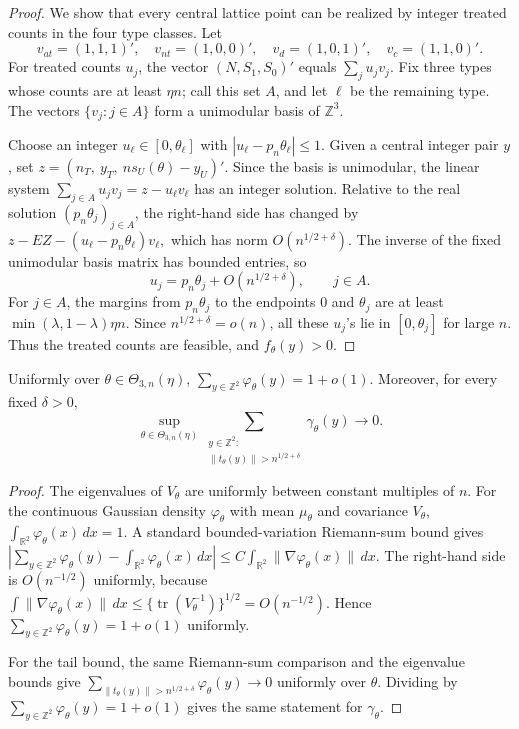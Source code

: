 \documentclass[12pt,reqno]{amsart}
\begin{document}
\begin{proof}
We show that every central lattice point can be realized by integer treated
counts in the four type classes.  Let
\[
v_{at}=(1,1,1)',\quad
v_{nt}=(1,0,0)',\quad
v_d=(1,0,1)',\quad
v_c=(1,1,0)'.
\]
For treated counts \(u_j\), the vector \((N,S_1,S_0)'\) equals
\(\sum_j u_jv_j\).  Fix three types whose counts are at least \(\eta n\); call
this set \(A\), and let \(\ell\) be the remaining type.  The vectors
\(\{v_j:j\in A\}\) form a unimodular basis of \(\mathbb Z^3\).

Choose an integer \(u_\ell\in[0,\theta_\ell]\) with
\(|u_\ell-p_n\theta_\ell|\le1\).  Given a central integer pair \(y\), set
\(
z=(n_T,\ y_T,\ ns_U(\theta)-y_U)'.
\)
Since the basis is unimodular, the linear system
\(
\sum_{j\in A}u_jv_j=z-u_\ell v_\ell
\)
has an integer solution.  Relative to the real solution
\((p_n\theta_j)_{j\in A}\), the right-hand side has changed by
\(
z-E Z-(u_\ell-p_n\theta_\ell)v_\ell,
\)
which has norm \(O(n^{1/2+\delta})\).  The inverse of the fixed unimodular basis
matrix has bounded entries, so
\[
u_j=p_n\theta_j+O(n^{1/2+\delta}),\qquad j\in A.
\]
For \(j\in A\), the margins from \(p_n\theta_j\) to the endpoints \(0\) and
\(\theta_j\) are at least \(\min(\lambda,1-\lambda)\eta n\).  Since
\(n^{1/2+\delta}=o(n)\), all these \(u_j\)'s lie in \([0,\theta_j]\) for large
\(n\).  Thus the treated counts are feasible, and \(f_\theta(y)>0\).
\end{proof}

\begin{lem}\label{lem:gaussian-normalizer}
Uniformly over \(\theta\in\Theta_{3,n}(\eta)\),
\(
\sum_{y\in\mathbb Z^2}\varphi_\theta(y)=1+o(1).
\)
Moreover, for every fixed \(\delta>0\),
\[
\sup_{\theta\in\Theta_{3,n}(\eta)}
\sum_{\substack{y\in\mathbb Z^2: \\ \|t_\theta(y)\|>n^{1/2+\delta}}}\gamma_\theta(y)\to0.
\]
\end{lem}

\begin{proof}
The eigenvalues of \(V_\theta\) are uniformly between constant multiples of
\(n\).  For the continuous Gaussian density \(\varphi_\theta\) with mean
\(\mu_\theta\) and covariance \(V_\theta\),
\(
\int_{\mathbb R^2}\varphi_\theta(x)\,dx=1.
\)
A standard bounded-variation Riemann-sum bound gives
\(
\left|
\sum_{y\in\mathbb Z^2}\varphi_\theta(y)
-\int_{\mathbb R^2}\varphi_\theta(x)\,dx
\right|
\le
C\int_{\mathbb R^2}\|\nabla\varphi_\theta(x)\|\,dx.
\)
The right-hand side is \(O(n^{-1/2})\) uniformly, because
\(
\int\|\nabla\varphi_\theta(x)\|\,dx
\le
\{\operatorname{tr}(V_\theta^{-1})\}^{1/2}
=O(n^{-1/2}).
\)
Hence \(\sum_{y\in\mathbb Z^2}\varphi_\theta(y)=1+o(1)\) uniformly.

For the tail bound, the same Riemann-sum comparison and the eigenvalue bounds
give
\(
\sum_{\|t_\theta(y)\|>n^{1/2+\delta}}\varphi_\theta(y)\to0
\)
uniformly over \(\theta\).  Dividing by
\(\sum_{y\in\mathbb Z^2}\varphi_\theta(y)=1+o(1)\) gives the same statement for
\(\gamma_\theta\).
\end{proof}
\end{document}
